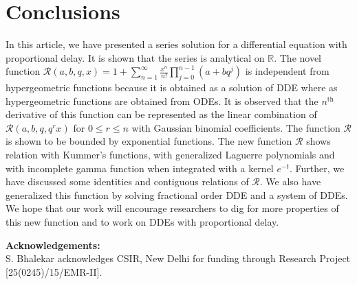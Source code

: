 \documentclass[12pt]{article}
\numberwithin{equation}{section}
\begin{document}
\section{Conclusions}\label{concl}
In this article, we have presented a series solution for a  differential equation with proportional delay. It is shown that the series is analytical on  $\mathbb{R}$. The novel function $\mathcal{R}(a,b,q,x)=  1 + \sum_{n=1}^\infty \frac{x^n}{n!}\prod_{j=0}^{n-1}\left(a+bq^j\right)$ is independent from hypergeometric functions because it is obtained as a solution of DDE where as hypergeometric functions are obtained from ODEs. It is observed that the $n^\textrm{th}$ derivative of this function can be represented as the linear combination of $ \mathcal{R}(a,b,q,q^r x)$  for $0\leq r \leq n$ with Gaussian binomial coefficients. The function $\mathcal{R}$ is shown to be bounded by exponential functions. The new function $\mathcal{R}$ shows relation with Kummer's functions, with generalized  Laguerre polynomials and with incomplete gamma function when integrated with a kernel $e^{-t}$. Further, we have discussed some identities and contiguous relations of $\mathcal{R}$. We also have generalized this function by solving fractional order DDE and a system of DDEs. We hope that our work will encourage researchers to dig for more properties of this new function and to work on DDEs with proportional delay.


\textbf{Acknowledgements:}\\
S. Bhalekar acknowledges CSIR, New Delhi for funding through Research Project [25(0245)/15/EMR-II].
\end{document}
